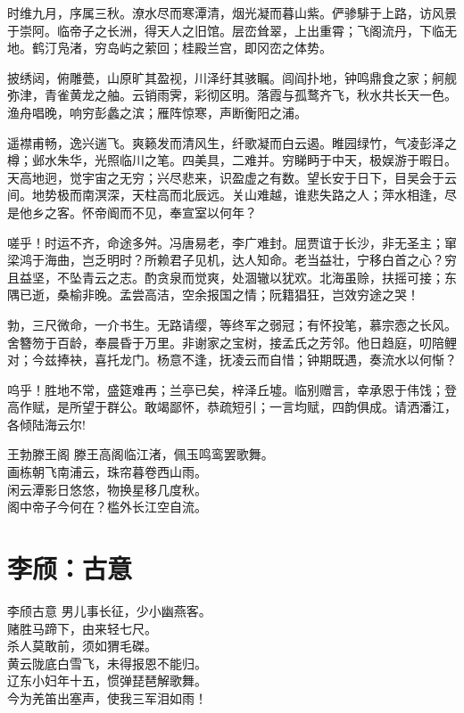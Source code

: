 \documentclass[12pt,oneside,a5paper]{book}
\begin{document}
时维九月，序属三秋。潦水尽而寒潭清，烟光凝而暮山紫。俨骖騑于上路，访风景于崇阿。临帝子之长洲，得天人之旧馆。层峦耸翠，上出重霄；飞阁流丹，下临无地。鹤汀凫渚，穷岛屿之萦回；桂殿兰宫，即冈峦之体势。

披绣闼，俯雕甍，山原旷其盈视，川泽纡其骇瞩。闾阎扑地，钟鸣鼎食之家；舸舰弥津，青雀黄龙之舳。云销雨霁，彩彻区明。落霞与孤鹜齐飞，秋水共长天一色。渔舟唱晚，响穷彭蠡之滨；雁阵惊寒，声断衡阳之浦。

遥襟甫畅，逸兴遄飞。爽籁发而清风生，纤歌凝而白云遏。睢园绿竹，气凌彭泽之樽；邺水朱华，光照临川之笔。四美具，二难并。穷睇眄于中天，极娱游于暇日。天高地迥，觉宇宙之无穷；兴尽悲来，识盈虚之有数。望长安于日下，目吴会于云间。地势极而南溟深，天柱高而北辰远。关山难越，谁悲失路之人；萍水相逢，尽是他乡之客。怀帝阍而不见，奉宣室以何年？

嗟乎！时运不齐，命途多舛。冯唐易老，李广难封。屈贾谊于长沙，非无圣主；窜梁鸿于海曲，岂乏明时？所赖君子见机，达人知命。老当益壮，宁移白首之心？穷且益坚，不坠青云之志。酌贪泉而觉爽，处涸辙以犹欢。北海虽赊，扶摇可接；东隅已逝，桑榆非晚。孟尝高洁，空余报国之情；阮籍猖狂，岂效穷途之哭！

勃，三尺微命，一介书生。无路请缨，等终军之弱冠；有怀投笔，慕宗悫之长风。舍簪笏于百龄，奉晨昏于万里。非谢家之宝树，接孟氏之芳邻。他日趋庭，叨陪鲤对；今兹捧袂，喜托龙门。杨意不逢，抚凌云而自惜；钟期既遇，奏流水以何惭？

呜乎！胜地不常，盛筵难再；兰亭已矣，梓泽丘墟。临别赠言，幸承恩于伟饯；登高作赋，是所望于群公。敢竭鄙怀，恭疏短引；一言均赋，四韵俱成。请洒潘江，各倾陆海云尔!

\begin{poemzh}{王勃}{滕王阁}
滕王高阁临江渚，佩玉鸣鸾罢歌舞。\\
画栋朝飞南浦云，珠帘暮卷西山雨。\\
闲云潭影日悠悠，物换星移几度秋。\\
阁中帝子今何在？槛外长江空自流。\\
\end{poemzh}

\chapter{李颀：古意}
\begin{poemzh}{李颀}{古意}
男儿事长征，少小幽燕客。\\
赌胜马蹄下，由来轻七尺。\\
杀人莫敢前，须如猬毛磔。\\
黄云陇底白雪飞，未得报恩不能归。\\
辽东小妇年十五，惯弹琵琶解歌舞。\\
今为羌笛出塞声，使我三军泪如雨！\\ 
\end{poemzh}
\end{document}
